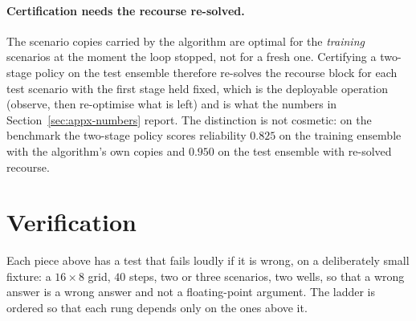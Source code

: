 \documentclass[11pt]{article}
\begin{document}
\paragraph{Certification needs the recourse re-solved.} The scenario copies
carried by the algorithm are optimal for the \emph{training} scenarios at the
moment the loop stopped, not for a fresh one. Certifying a two-stage policy on
the test ensemble therefore re-solves the recourse block for each test scenario
with the first stage held fixed, which is the deployable operation (observe, then
re-optimise what is left) and is what the numbers in
Section~\ref{sec:appx-numbers} report. The distinction is not cosmetic: on the
benchmark the two-stage policy scores reliability $0.825$ on the training
ensemble with the algorithm's own copies and $0.950$ on the test ensemble with
re-solved recourse.

\section{Verification}
\label{sec:appx-ver}

Each piece above has a test that fails loudly if it is wrong, on a deliberately
small fixture: a $16\times8$ grid, $40$ steps, two or three scenarios, two wells,
so that a wrong answer is a wrong answer and not a floating-point argument. The
ladder is ordered so that each rung depends only on the ones above it.
\end{document}

